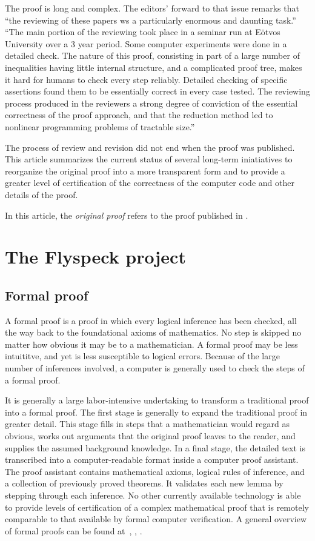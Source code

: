 \documentclass[11pt]{amsart}
\begin{document}
The proof is long and complex.  The editors' forward to that issue remarks
that ``the reviewing of these papers ws a particularly enormous and daunting task.''
``The main portion of the reviewing took place in a seminar run at E\"otvos University
over a 3 year period.  Some computer experiments were done in a detailed check.
The nature of this proof, consisting in part of a large number of inequalities having
little internal structure, and a complicated proof tree, makes it hard for humans
to check every step reliably.  Detailed checking of specific assertions found them to
be essentially correct in every case tested.  The reviewing process produced in the
reviewers a strong degree of conviction of the essential correctness of the proof
approach, and that the reduction method led to nonlinear programming problems of
tractable size.''

The process of review and revision did not end when the proof was published.
This article summarizes the current status of several long-term iniatiatives to
reorganize the original proof into a more transparent form and to provide a greater
level of certification of the correctness of the computer code and other details of the proof.

In this article, the {\it original proof} refers to the proof published
in \cite{Hales:2006:DCG}.

\section{The Flyspeck project}

\subsection*{Formal proof}

A formal proof is a proof in which every logical inference has been checked, all the way back to the foundational axioms of mathematics.  No step is skipped no matter how obvious it may be to a mathematician.  
A formal proof may be less intuititve, and yet is less susceptible to logical
errors.  Because of the large number of inferences involved, a computer is generally used to check the steps of a formal proof.

It is generally a large labor-intensive
undertaking to transform a traditional proof
into a formal proof.   The first stage is generally to expand the traditional proof in greater detail.  This stage fills in steps that a mathematician would regard as obvious,  works out arguments that the original proof leaves to the reader,  and supplies the assumed background knowledge.  
In a final stage, the detailed text is transcribed into a computer-readable format inside
a computer proof assistant.  The proof assistant  contains  mathematical axioms, logical rules of inference, and a collection of previously proved theorems. 
It validates each new lemma by stepping through each inference.  No other currently available technology is able to provide levels of certification of a complex mathematical proof that is remotely comparable to that available by formal computer verification.  A general overview
of formal proofs can be found at~\cite{gonthier:2008:formal}, \cite{Hales:2008:formal}, \cite{Harrison:2008:formal}.
\end{document}
